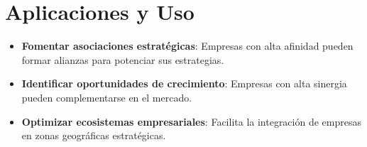 \documentclass[a4paper,12pt]{article}
\begin{document}
\section{Aplicaciones y Uso}
\begin{itemize}
    \item \textbf{Fomentar asociaciones estratégicas}: Empresas con alta afinidad pueden formar alianzas para potenciar sus estrategias.
    \item \textbf{Identificar oportunidades de crecimiento}: Empresas con alta sinergia pueden complementarse en el mercado.
    \item \textbf{Optimizar ecosistemas empresariales}: Facilita la integración de empresas en zonas geográficas estratégicas.
\end{itemize}
\end{document}
